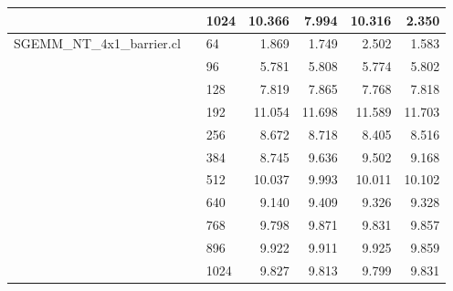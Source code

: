 \begin{tabular}{l|l|l|rrrr}
                &        & 1024 &  10.366 &   7.994 &  10.316 &   2.350 \\
\midrule
SGEMM\_NT\_4x1\_barrier.cl &        & 64   &   1.869 &   1.749 &   2.502 &   1.583 \\
                &        & 96   &   5.781 &   5.808 &   5.774 &   5.802 \\
                &        & 128  &   7.819 &   7.865 &   7.768 &   7.818 \\
                &        & 192  &  11.054 &  11.698 &  11.589 &  11.703 \\
                &        & 256  &   8.672 &   8.718 &   8.405 &   8.516 \\
                &        & 384  &   8.745 &   9.636 &   9.502 &   9.168 \\
                &        & 512  &  10.037 &   9.993 &  10.011 &  10.102 \\
                &        & 640  &   9.140 &   9.409 &   9.326 &   9.328 \\
                &        & 768  &   9.798 &   9.871 &   9.831 &   9.857 \\
                &        & 896  &   9.922 &   9.911 &   9.925 &   9.859 \\
                &        & 1024 &   9.827 &   9.813 &   9.799 &   9.831 \\
\bottomrule
\end{tabular}
